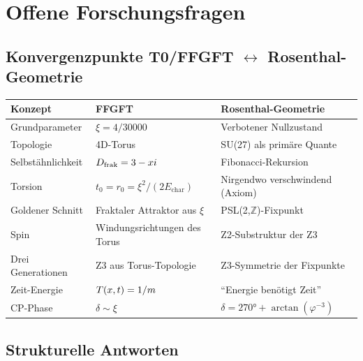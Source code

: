 \section{Offene Forschungsfragen}

\subsection{Konvergenzpunkte T0/FFGFT $\leftrightarrow$ Rosenthal-Geometrie}

\begin{center}
\begin{tabular}{@{}lll@{}}
\toprule
Konzept & FFGFT & Rosenthal-Geometrie \\
\midrule
Grundparameter & $\xi = 4/30000$ & Verbotener Nullzustand \\
Topologie & 4D-Torus & SU(27) als primäre Quante \\
Selbstähnlichkeit & $D_{\text{frak}} = 3 - xi$ & Fibonacci-Rekursion \\
Torsion & $t_0 = r_0 = \xi^2/(2E_{\text{char}})$ & Nirgendwo verschwindend (Axiom) \\
Goldener Schnitt & Fraktaler Attraktor aus $\xi$ & PSL(2,$\mathbb{Z}$)-Fixpunkt \\
Spin & Windungsrichtungen des Torus & Z2-Substruktur der Z3 \\
Drei Generationen & Z3 aus Torus-Topologie & Z3-Symmetrie der Fixpunkte \\
Zeit-Energie & $T(x,t) = 1/m$ & ``Energie benötigt Zeit'' \\
CP-Phase & $\delta \sim \xi$ & $\delta = 270° + \arctan(\varphi^{-3})$ \\
\bottomrule
\end{tabular}
\end{center}

\subsection{Strukturelle Antworten}

